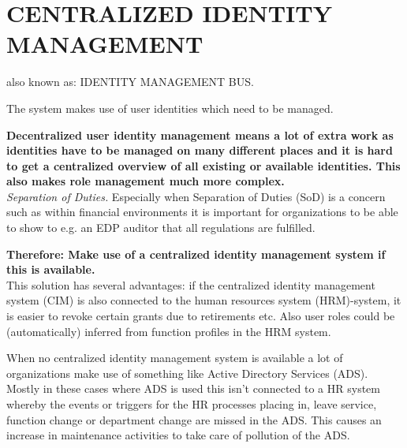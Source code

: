 \newpage
\section*{CENTRALIZED IDENTITY MANAGEMENT}
also known as: IDENTITY MANAGEMENT BUS.

The system makes use of user identities which need to be managed. 

\begin{center}
  
\end{center}

\textbf{Decentralized user identity management means a lot of extra work as identities have to be managed on many different places and it is hard to get a centralized overview of all existing or available identities. This also makes role management much more complex.}\\

\textit{Separation of Duties.} Especially when Separation of Duties (SoD) is a concern such as within financial environments it is important for organizations to be able to show to e.g. an EDP auditor that all regulations are fulfilled.

\begin{center}
   
\end{center}

\textbf{Therefore: Make use of a centralized identity management system if this is available.}\\

This solution has several advantages: if the centralized identity management system (CIM) is also connected to the human resources system (HRM)-system, it is easier to revoke certain grants due to retirements etc. Also user roles could be (automatically) inferred from function profiles in the HRM system.


When no centralized identity management system is available a lot of organizations make use of something like Active Directory Services (ADS). Mostly in these cases where ADS is used this isn't connected to a HR system whereby the events or triggers for the HR processes placing in, leave service, function change or department change are missed in the ADS. This causes an increase in maintenance activities to take care of pollution of the ADS.


